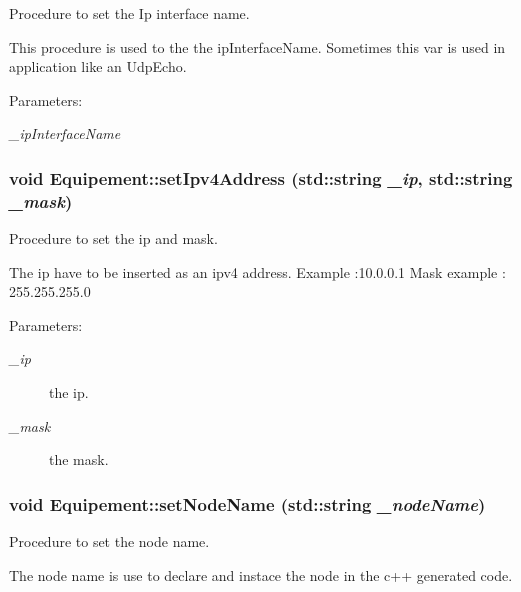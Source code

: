 Procedure to set the Ip interface name. 

This procedure is used to the the ipInterfaceName. Sometimes this var is used in application like an UdpEcho.

\begin{Desc}
\item[Parameters:]
\begin{description}
\item[{\em \_\-ipInterfaceName}]\end{description}
\end{Desc}
\hypertarget{class_equipement_ff68b70ae1942fca75462d78194cd443}{
\subsubsection[{setIpv4Address}]{\setlength{\rightskip}{0pt plus 5cm}void Equipement::setIpv4Address (std::string {\em \_\-ip}, \/  std::string {\em \_\-mask})}}
\label{class_equipement_ff68b70ae1942fca75462d78194cd443}


Procedure to set the ip and mask. 

The ip have to be inserted as an ipv4 address. Example :10.0.0.1 Mask example : 255.255.255.0

\begin{Desc}
\item[Parameters:]
\begin{description}
\item[{\em \_\-ip}]the ip. \item[{\em \_\-mask}]the mask. \end{description}
\end{Desc}
\hypertarget{class_equipement_a3d502e4f5b4292e87ff33ca15801897}{
\subsubsection[{setNodeName}]{\setlength{\rightskip}{0pt plus 5cm}void Equipement::setNodeName (std::string {\em \_\-nodeName})}}
\label{class_equipement_a3d502e4f5b4292e87ff33ca15801897}


Procedure to set the node name. 

The node name is use to declare and instace the node in the c++ generated code.

